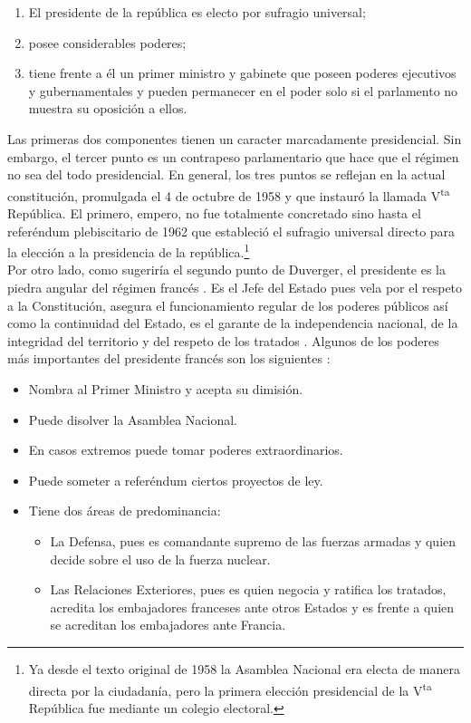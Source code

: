 \begin{enumerate}
\item El presidente de la república es electo por sufragio universal;
\item posee considerables poderes;
\item tiene frente a él un primer ministro y gabinete que poseen poderes ejecutivos y gubernamentales y pueden permanecer en el poder solo si el parlamento no muestra su oposición a ellos.
\end{enumerate}

Las primeras dos componentes tienen un caracter marcadamente presidencial. Sin embargo, el tercer punto es un contrapeso parlamentario que hace que el régimen no sea del todo presidencial. En general, los tres puntos se reflejan en la actual constitución, promulgada el 4 de octubre de 1958 y que instauró la llamada V\textsuperscript{ta} República. El primero, empero, no fue totalmente concretado sino hasta el referéndum plebiscitario de 1962 que estableció el sufragio universal directo para la elección a la presidencia de la república.\footnote{Ya desde el texto original de 1958 la Asamblea Nacional era electa de manera directa por la ciudadanía, pero la primera elección presidencial de la V\textsuperscript{ta} República fue mediante un colegio electoral.}\\ 

Por otro lado, como sugeriría el segundo punto de Duverger, el presidente es la piedra angular del régimen francés \parencite{AN17a}. Es el Jefe del Estado pues vela por el respeto a la Constitución, asegura el funcionamiento regular de los poderes públicos así como la continuidad del Estado, es el garante de la independencia nacional, de la integridad del territorio y del respeto de los tratados \parencite{ConstFr}. Algunos de los poderes más importantes del presidente francés son los siguientes \parencites{AN17a}{ViePublique}: 

\begin{itemize}
\item Nombra al Primer Ministro y acepta su dimisión. 
\item Puede disolver la Asamblea Nacional. 
\item En casos extremos puede tomar poderes extraordinarios. 
\item Puede someter a referéndum ciertos proyectos de ley. 
\item Tiene dos áreas de predominancia: 
		\begin{itemize}
		\item La Defensa, pues es comandante supremo de las fuerzas armadas y quien decide sobre el uso de la fuerza nuclear. 
		\item Las Relaciones Exteriores, pues es quien negocia y ratifica los tratados, acredita los embajadores franceses ante otros Estados y es frente a quien se acreditan los embajadores ante Francia.
		\end{itemize}
\end{itemize}

